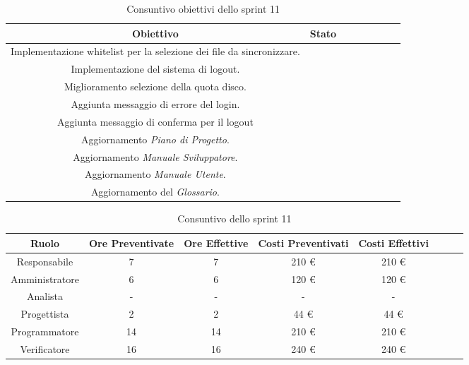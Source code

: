 \begin{table}[H]
		\begin{center}
			\setlength{\aboverulesep}{0pt}
			\setlength{\belowrulesep}{0pt}
			\setlength{\extrarowheight}{.75ex}
			\begin{tabular}{ c c c c c c c c }
				\rowcolor{AzzurroGruppo!30} 
				\textbf{Obiettivo} & \textbf{Stato} \\
				\toprule
				Implementazione whitelist per la selezione dei file da sincronizzare. & \checkmark{} \\
				Implementazione del sistema di logout. & \checkmark{} \\
				Miglioramento selezione della quota disco. & \checkmark{} \\
				Aggiunta messaggio di errore del login. & \xmark{} \\
				Aggiunta messaggio di conferma per il logout & \checkmark{} \\
				Aggiornamento \textit{Piano di Progetto}. & \checkmark{} \\
				Aggiornamento \textit{Manuale Sviluppatore}. & \checkmark{} \\
				Aggiornamento \textit{Manuale Utente}. & \checkmark{} \\
				Aggiornamento del \textit{Glossario}. & \checkmark{} \\
				\bottomrule
			\end{tabular}
			\caption{Consuntivo obiettivi dello sprint 11}
		\end{center}
	\end{table}

\begin{table}[H]
		\begin{center}
			\setlength{\aboverulesep}{0pt}
			\setlength{\belowrulesep}{0pt}
			\setlength{\extrarowheight}{.75ex}
			\begin{tabular}{ c c c c c c c c }
				\rowcolor{AzzurroGruppo!30} 
				\textbf{Ruolo} & \textbf{Ore Preventivate} & \textbf{Ore Effettive} & \textbf{Costi Preventivati} & \textbf{Costi Effettivi}\\
				\toprule
				Responsabile   & 7 & 7 & 210 \euro{}  & 210 \euro{}\\
				Amministratore & 6 & 6 & 120 \euro{}  & 120 \euro{} \\
				Analista       & - & - & - & - \\
				Progettista    & 2 & 2 & 44 \euro{} & 44 \euro{} \\
				Programmatore  & 14 & 14 & 210 \euro{}  & 210 \euro{} \\
				Verificatore   & 16 & 16 & 240 \euro{}  & 240 \euro{} \\
				\bottomrule
			\end{tabular}
			\caption{Consuntivo dello sprint 11}
		\end{center}
	\end{table}
	
